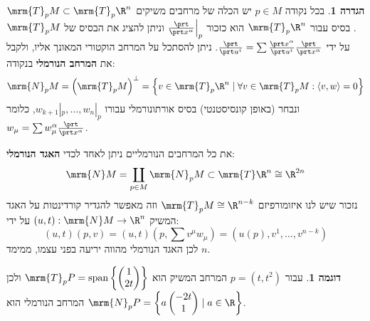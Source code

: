 \documentclass{article}
\theoremstyle{definition}
\newtheorem*{definition*}{הגדרה}
\newtheorem*{example*}{דוגמה}
\DeclareMathOperator{\spn}{span}
\begin{document}
	\begin{definition*}
		בכל נקודה
		$p\in M$
		יש הכלה של מרחבים משיקים
		\(\mrm{T}_p M \subset \mrm{T}_p \R^n\).
		בסיס עבור
		\(\mrm{T}_p \R^n\)
		הוא כזכור
		\(\frac{\prt}{\prt x^\alpha}\Big|_p\)
		וניתן להציג את הבסיס של
		\(\mrm{T}_p M\)
		על ידי
		\(\frac{\prt}{\prt u^i} = \sum \frac{\prt x^\alpha}{\prt u^i} \frac{\prt}{\prt x^\alpha}\).
		ניתן להסתכל על המרחב הוקטורי המאונך אליו, ולקבל את \textbf{המרחב הנורמלי} בנקודה:
		\[
			\mrm{N}_p M
			= \left(\mrm{T}_p M\right)^\bot
			= \left\{
				v \in \mrm{T}_p \R^n
				\mid
				\forall v \in \mrm{T}_p M: \langle v,w \rangle=0
			\right\}
		\]
		ונבחר (באופן קונסיסטנטי) בסיס אורתונורמלי עבורו
		\(w_{k+1}|_p,\dotsc,w_{n}|_p\),
		כלומר
		\(w_\mu=\sum w_\mu^\alpha \frac{\prt}{\prt x^\alpha}\).
		
		את כל המרחבים הנורמליים ניתן לאחד לכדי \textbf{האגד הנורמלי}:
		\[
			\mrm{N} M
			= \coprod_{p \in M} \mrm{N}_p M
			\subset \mrm{T} \R^n
			\cong \R^{2n}
		\]
		נזכור שיש לנו איזומורפיזם
		\(\mrm{T}_p M \cong \R^{n-k}\)
		וזה מאפשר להגדיר קורדינטות על האגד המשיק
		\((u,t): \mrm{N} M \to \R^n\)
		על ידי:
		\[
		(u,t)(p,v)
		= (u,t)(p,\sum v^\mu w_\mu)
		= (u(p),v^1,\dotsc,v^{n-k})
		\]
		לכן האגד הנורמלי מהווה יריעה בפני עצמו, ממימד \(n\).
	\end{definition*}

	\begin{example*}
		עבור
		\(p=(t,t^2)\)
		המרחב המשיק הוא
		\(
			\mrm{T}_p P
			= \spn\left\{
				\begin{pmatrix}
					1\\2t
				\end{pmatrix}
			\right\}
		\)
		ולכן המרחב הנורמלי הוא
		\(
			\mrm{N}_p P
			= \left\{
				a
				\begin{pmatrix}
					-2t\\1
				\end{pmatrix}
				\mid
				a \in \R
			\right\}
		\).
	\end{example*}
\end{document}
